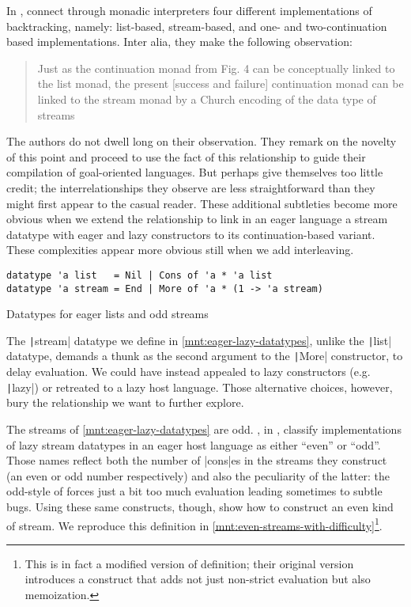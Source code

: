 \documentclass[screen,anonymous,review,draft,natbib=false]{acmart} %
\begin{document}
In , \citeauthor{danvy2002unifying}
connect through monadic interpreters four different implementations of
backtracking, namely: list-based, stream-based, and one- and
two-continuation based implementations. Inter alia, they make the
following observation:
%
\begin{quote}
  Just as the continuation monad from Fig. 4 can be conceptually
  linked to the list monad, the present [success and failure]
  continuation monad can be linked to the stream monad by a Church
  encoding of the data type of streams
\end{quote}
%
The authors do not dwell long on their observation. They remark on the
novelty of this point and proceed to use the fact of this relationship
to guide their compilation of goal-oriented languages. But
\citeauthor{danvy2002unifying} perhaps give themselves too little
credit; the interrelationships they observe are less straightforward
than they might first appear to the casual reader. These additional
subtleties become more obvious when we extend the relationship to link
in an eager language a stream datatype with eager and lazy
constructors to its continuation-based variant. These complexities
appear more obvious still when we add interleaving.

\begin{listing}
\begin{verbatim}
datatype 'a list   = Nil | Cons of 'a * 'a list
datatype 'a stream = End | More of 'a * (1 -> 'a stream)
\end{verbatim}
\caption{Datatypes for eager lists and odd streams}
\label{mnt:eager-lazy-datatypes}
\end{listing}

The \texttt|stream| datatype we define in
\cref{mnt:eager-lazy-datatypes}, unlike the \texttt|list| datatype,
demands a thunk as the second argument to the \texttt|More|
constructor, to delay evaluation. We could have instead appealed to
lazy constructors (e.g. \texttt|lazy|) or retreated to a lazy
host language. Those alternative choices, however, bury the
relationship we want to further explore.

The streams of \cref{mnt:eager-lazy-datatypes} are
odd. \citeauthor{wadler1998add}, in ,
classify implementations of lazy stream datatypes in an eager host
language as either \enquote{even} or \enquote{odd}. Those names
reflect both the number of \rackinline|cons|es in the streams they
construct (an even or odd number respectively) and also the
peculiarity of the latter: the odd-style of forces just a bit too much
evaluation leading sometimes to subtle bugs. Using these same
constructs, though, \citeauthor{wadler1998add} show how to construct
an even kind of stream. We reproduce this definition in
\cref{mnt:even-streams-with-difficulty}\footnote{This is in fact a
  modified version of  definition; their
  original version introduces a construct that adds not just
  non-strict evaluation but also memoization.}.
  
\end{document}
